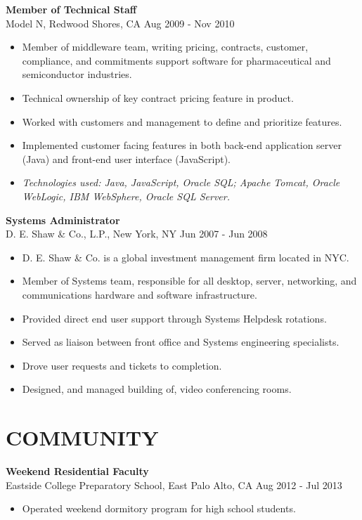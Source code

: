\documentclass[line,margin]{res}
\begin{document}
\begin{resume}
\textbf{Member of Technical Staff} \\
Model N, Redwood Shores, CA \hfill Aug 2009 - Nov 2010
\begin{itemize}  \itemsep -2pt %
\item Member of middleware team, writing pricing, contracts, customer,
      compliance, and commitments support software for pharmaceutical and
      semiconductor industries.
\item Technical ownership of key contract pricing feature in product.
\item Worked with customers and management to define and prioritize features.
\item Implemented customer facing features in both back-end application server
      (Java) and front-end user interface (JavaScript).
\item \textit{Technologies used: Java, JavaScript, Oracle SQL; Apache Tomcat,
              Oracle\\\mbox{WebLogic}, IBM WebSphere, Oracle SQL Server.}
\end{itemize}


\textbf{Systems Administrator} \\
D. E. Shaw \& Co., L.P., New York, NY \hfill Jun 2007 - Jun 2008
\begin{itemize}  \itemsep -2pt %
\item D. E. Shaw \& Co. is a global investment management firm located in NYC.
\item Member of Systems team, responsible for all desktop, server, networking,
      and communications hardware and software infrastructure.
\item Provided direct end user support through Systems Helpdesk rotations.
\item Served as liaison between front office and Systems engineering
      specialists.
\item Drove user requests and tickets to completion.
\item Designed, and managed building of, video conferencing rooms.
\end{itemize}


\section{COMMUNITY}
\textbf{Weekend Residential Faculty} \\
Eastside College Preparatory School, East Palo Alto, CA \hfill Aug 2012 - Jul 2013
\begin{itemize}  \itemsep -2pt %
\item Operated weekend dormitory program for high school students.
\end{itemize}


\end{resume}
\end{document}
